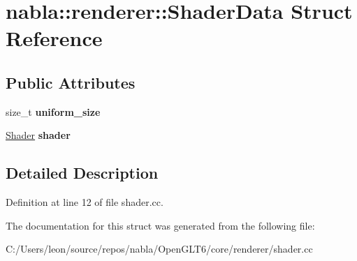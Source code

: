 \hypertarget{structnabla_1_1renderer_1_1_shader_data}{}\section{nabla\+::renderer\+::Shader\+Data Struct Reference}
\label{structnabla_1_1renderer_1_1_shader_data}
\subsection*{Public Attributes}
\begin{DoxyCompactItemize}
\item 
\mbox{\label{structnabla_1_1renderer_1_1_shader_data_a903d6a958801b9b85c19b3062bfb82ff}} 
size\+\_\+t {\bfseries uniform\+\_\+size}
\item 
\mbox{\label{structnabla_1_1renderer_1_1_shader_data_a72b22eb982857f0f1b2d8dd239bad096}} 
\mbox{\hyperlink{classnabla_1_1renderer_1_1_shader}{Shader}} {\bfseries shader}
\end{DoxyCompactItemize}


\subsection{Detailed Description}


Definition at line 12 of file shader.\+cc.



The documentation for this struct was generated from the following file\+:\begin{DoxyCompactItemize}
\item 
C\+:/\+Users/leon/source/repos/nabla/\+Open\+G\+L\+T6/core/renderer/shader.\+cc\end{DoxyCompactItemize}

